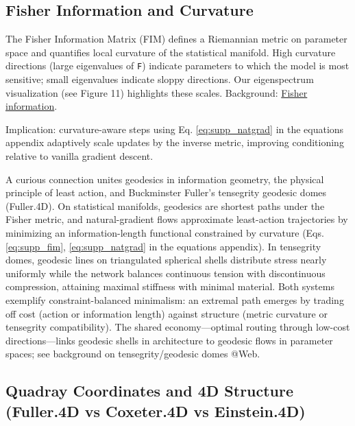 \documentclass[
  10pt,
]{article}
\newcommand{\passthrough}[1]{#1}
\begin{document}
\hypertarget{fisher-information-and-curvature}{%
\subsection{Fisher Information and
Curvature}\label{fisher-information-and-curvature}}

The Fisher Information Matrix (FIM) defines a Riemannian metric on
parameter space and quantifies local curvature of the statistical
manifold. High curvature directions (large eigenvalues of
\passthrough{\lstinline!F!}) indicate parameters to which the model is
most sensitive; small eigenvalues indicate sloppy directions. Our
eigenspectrum visualization (see Figure 11) highlights these scales.
Background:
\href{https://en.wikipedia.org/wiki/Fisher_information}{Fisher
information}.

Implication: curvature-aware steps using Eq. \eqref{eq:supp_natgrad} in
the equations appendix adaptively scale updates by the inverse metric,
improving conditioning relative to vanilla gradient descent.

A curious connection unites geodesics in information geometry, the
physical principle of least action, and Buckminster Fuller's tensegrity
geodesic domes (Fuller.4D). On statistical manifolds, geodesics are
shortest paths under the Fisher metric, and natural-gradient flows
approximate least-action trajectories by minimizing an
information-length functional constrained by curvature (Eqs.
\eqref{eq:supp_fim}, \eqref{eq:supp_natgrad} in the equations appendix).
In tensegrity domes, geodesic lines on triangulated spherical shells
distribute stress nearly uniformly while the network balances continuous
tension with discontinuous compression, attaining maximal stiffness with
minimal material. Both systems exemplify constraint-balanced minimalism:
an extremal path emerges by trading off cost (action or information
length) against structure (metric curvature or tensegrity
compatibility). The shared economy---optimal routing through low-cost
directions---links geodesic shells in architecture to geodesic flows in
parameter spaces; see background on tensegrity/geodesic domes @Web.

\hypertarget{quadray-coordinates-and-4d-structure-fuller.4d-vs-coxeter.4d-vs-einstein.4d}{%
\subsection{Quadray Coordinates and 4D Structure (Fuller.4D vs
Coxeter.4D vs
Einstein.4D)}\label{quadray-coordinates-and-4d-structure-fuller.4d-vs-coxeter.4d-vs-einstein.4d}}
\end{document}
